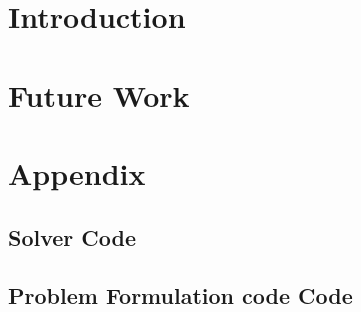 \documentclass[MTech]{iitmdiss}
\begin{document}
\acknowledgements


\abstract

\pagebreak


\begin{singlespace}
\tableofcontents
\thispagestyle{empty}

\listoftables
{}
\listoffigures
{}
\end{singlespace}

\pagebreak


%
%
\chapter{Introduction}



\chapter{Future Work}

\chapter{Appendix}

\section{Solver Code}

\pagebreak
\section{Problem Formulation code Code}

\pagebreak

\pagebreak

\pagebreak

\pagebreak

\pagebreak

\pagebreak

\pagebreak
\begin{singlespace}
  \begin{small}
	
  \end{small}
\end{singlespace}

\end{document}
